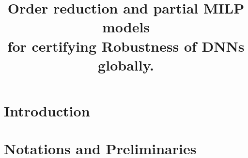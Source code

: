 \documentclass{llncs}
\title{Order reduction and partial MILP models \\
for certifying Robustness of DNNs globally.}
\date{}
\begin{document}
	
	\maketitle
	\linenumbers
	\begin{abstract}

\iffalse
Most DNNs are brittle to small perturbations. Extensive works have thus been performed to verify robustness for DNNs.
However, these works mostly consider local robustness, i.e. in the neighborhood of an image.
While local robustness is useful to have an idea how often non robust images happen, by repeating the verification on 1000 or 10000 pre-obtained images, the main shortcoming is that we have no guarantee that a specific new incoming image, e.g. in a video feed, is robust: The verification process takes too long and requires too much resources to be performed online on embedded systems.

In this paper, we consider {\em global} robustness, that is, guarantees not restricted to a set of local images. For that, we consider {\em bounds} on the switch of values between the different decision classes of a DNN due to a given perturbation. 
The verification question is much harder than local robustness, as the number of complex variables doubles (from the deviation image to the image and its deviation).
Further, the values each neuron can take is no more in a small neighborhood.
Therefore, the global verification process is very complex.
To obtain useable bounds, we develop several novel partial MILP models for global robustness, with different trade-offs. Last, we use order reduction techniques to reduce the space of images considered, avoiding unrealistic inputs, by using linear PCA. 
This results into usable bounds, allowing in real time to certify robustness for $87\%$ of incoming images in the MNIST benchmark for a L1-perturbation of $0.5$, as well as for a surrogate computing the hidden plastic strain associated to a deformation map of a pipe.
\fi
    \end{abstract}
	
	
	
	\section{Introduction}
	
	
	
	\section{Notations and Preliminaries}
	
\end{document}
